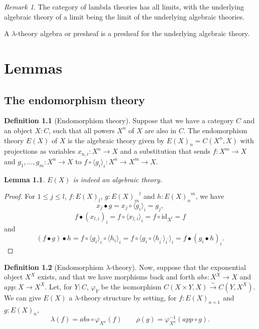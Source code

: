 \documentclass[a4paper]{amsbook}
\newtheorem{lemma}{Lemma}
\theoremstyle{definition}
\newtheorem{definition}{Definition}
\theoremstyle{remark}
\newtheorem{remark}{Remark}
\newcommand{\id}[1]{\ensuremath{\text{id}_{#1}}}
\begin{document}
  \begin{remark}
    The category of lambda theories has all limits, with the underlying algebraic theory of a limit being the limit of the underlying algebraic theories.
  \end{remark}

  A $ \lambda $-theory algebra or presheaf is a presheaf for the underlying algebraic theory.

  \chapter{Lemmas}

  \section{The endomorphism theory}

  \begin{definition}[Endomorphism theory]
    Suppose that we have a category $ C $ and an object $ X: C $, such that all powers $ X^n $ of $ X $ are also in $ C $.
    The endomorphism theory $ E(X) $ of $ X $ is the algebraic theory given by $ E(X)_n = C(X^n, X) $ with projections as variables $ x_{n, i}: X^n \to X $ and a substitution that sends $ f: X^m \to X $ and $ g_1, \dots, g_m: X^n \to X $ to $ f \circ \langle g_i \rangle_i: X^n \to X^m \to X $.
  \end{definition}

  \begin{lemma}
    $ E(X) $ is indeed an algebraic theory.
  \end{lemma}
  \begin{proof}
    For $ 1 \leq j \leq l $, $ f: E(X)_l $, $ g: {E(X)_m}^l $ and $ h: {E(X)_n}^m $, we have
    \[ x_j \bullet g = x_j \circ \langle g_i \rangle_i = g_j, \]
    \[ f \bullet (x_{l,i})_i = f \circ \langle x_{l, i} \rangle_i = f \circ \id{X^l} = f \]
    and
    \[ (f \bullet g) \bullet h = f \circ \langle g_i \rangle_i \circ \langle h_i \rangle_i = f \circ \langle g_i \circ \langle h_{i^\prime} \rangle_{i^\prime} \rangle_i = f \bullet (g_i \bullet h)_i. \]
  \end{proof}

  \begin{definition}[Endomorphism $ \lambda $-theory]
    Now, suppose that the exponential object $ X^X $ exists, and that we have morphisms back and forth $ abs: X^X \to X $ and $ app: X \to X^X $. Let, for $ Y: C $, $ \varphi_Y $ be the isomorphism $ C(X \times Y, X) \xrightarrow{\sim} C(Y, X^X) $.
    We can give $ E(X) $ a $ \lambda $-theory structure by setting, for $ f: E(X)_{n + 1} $ and $ g: E(X)_n $,
    \[ \lambda(f) = abs \circ \varphi_{X^n}(f) \qquad \rho(g) = \varphi_{X^n}^{-1}(app \circ g). \]
  \end{definition}
\end{document}
